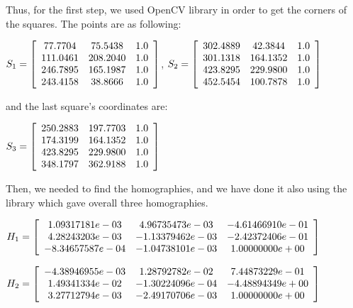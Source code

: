 \documentclass[]{article}
\begin{document}
\vspace{0.4em}

Thus, for the first step, we used OpenCV library in order to get the corners of the squares. The points are as following:

\centerline {
		$S_1 =\left[ {\begin{array}{*{20}c}
		77.7704 & 75.5438 & 1.0 \\
		111.0461 & 208.2040 & 1.0  \\ 
		246.7895 & 165.1987 & 1.0 \\
		243.4158 & 38.8666 & 1.0  
		\end{array} } \right] $, $S_2 =\left[ {\begin{array}{*{20}c}
		302.4889 & 42.3844 & 1.0 \\
		301.1318 & 164.1352 & 1.0  \\ 
		423.8295 & 229.9800 & 1.0 \\
		452.5454 & 100.7878 & 1.0  
		\end{array} } \right] $
}

and the last square's coordinates are: 

\centerline {
	$S_3 =\left[ {\begin{array}{*{20}c}
		250.2883 & 197.7703 & 1.0 \\
		174.3199 & 164.1352 & 1.0  \\ 
		423.8295 & 229.9800 & 1.0 \\
		348.1797 & 362.9188 & 1.0  
		\end{array} } \right] $
}

Then, we needed to find the homographies, and we have done it also using the library which gave overall three homographies. 

\vspace{0.5em}

\centerline {
	$H_1 =\left[ {\begin{array}{*{20}c}
		1.09317181e-03 & 4.96735473e-03 & -4.61466910e-01 \\
		4.28243203e-03 & -1.13379462e-03 & -2.42372406e-01  \\ 
		-8.34657587e-04 & -1.04738101e-03 & 1.00000000e+00 
		\end{array} } \right] $
}

\vspace{0.5em}

\centerline {
	$H_2 =\left[ {\begin{array}{*{20}c}
		-4.38946955e-03 & 1.28792782e-02 & 7.44873229e-01 \\
		1.49341334e-02 & -1.30224096e-04 & -4.48894349e+00  \\ 
		3.27712794e-03 & -2.49170706e-03 & 1.00000000e+00
		\end{array} } \right] $
}
\end{document}
